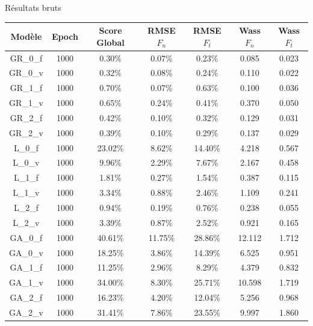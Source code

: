 \documentclass[
11pt,notheorems,hyperref={pdfauthor=whatever}
]{beamer}
\begin{document}
\begin{frame}{Résultats bruts}
    \begin{tabular}{c c c c c c c}
        \hline
        Modèle & Epoch & Score Global & RMSE $F_n$ & RMSE $F_t$ & Wass $F_n$ & Wass $F_t$ \\
        \hline
        GR\_0\_f & 1000 & 0.30\% & 0.07\% & 0.23\% & 0.085 & 0.023 \\
        GR\_0\_v & 1000 & 0.32\% & 0.08\% & 0.24\% & 0.110 & 0.022 \\
        GR\_1\_f & 1000 & 0.70\% & 0.07\% & 0.63\% & 0.100 & 0.036 \\
        GR\_1\_v & 1000 & 0.65\% & 0.24\% & 0.41\% & 0.370 & 0.050 \\
        GR\_2\_f & 1000 & 0.42\% & 0.10\% & 0.32\% & 0.129 & 0.031 \\
        GR\_2\_v & 1000 & 0.39\% & 0.10\% & 0.29\% & 0.137 & 0.029 \\
        \hline
        L\_0\_f  & 1000 & 23.02\% & 8.62\% & 14.40\% & 4.218 & 0.567 \\
        L\_0\_v  & 1000 & 9.96\%  & 2.29\% & 7.67\%  & 2.167 & 0.458 \\
        L\_1\_f  & 1000 & 1.81\%  & 0.27\% & 1.54\%  & 0.387 & 0.115 \\
        L\_1\_v  & 1000 & 3.34\%  & 0.88\% & 2.46\%  & 1.109 & 0.241 \\
        L\_2\_f  & 1000 & 0.94\%  & 0.19\% & 0.76\%  & 0.238 & 0.055 \\
        L\_2\_v  & 1000 & 3.39\%  & 0.87\% & 2.52\%  & 0.921 & 0.165 \\
        \hline
        GA\_0\_f & 1000 & 40.61\% & 11.75\% & 28.86\% & 12.112 & 1.712 \\
        GA\_0\_v & 1000 & 18.25\% & 3.86\%  & 14.39\% & 6.525  & 0.951 \\
        GA\_1\_f & 1000 & 11.25\% & 2.96\%  & 8.29\%  & 4.379  & 0.832 \\
        GA\_1\_v & 1000 & 34.00\% & 8.30\%  & 25.71\% & 10.598 & 1.719 \\
        GA\_2\_f & 1000 & 16.23\% & 4.20\%  & 12.04\% & 5.256  & 0.968 \\
        GA\_2\_v & 1000 & 31.41\% & 7.86\%  & 23.55\% & 9.997  & 1.860 \\
        \hline
    \end{tabular}
\end{frame}
\end{document}
